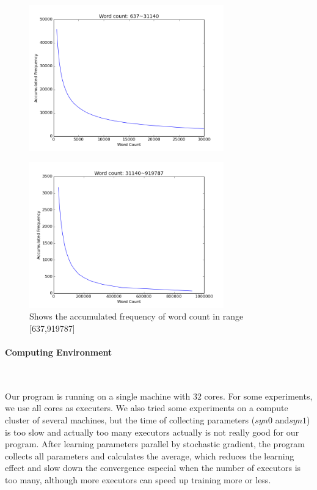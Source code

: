 \begin{figure}[H]
\centering
 	\includegraphics[width=0.75\textwidth]{637to31140} 
	\caption{Shows the accumulated frequency of word count in range [637,31140]}
	\label{fig:637to31140}
\begin{figure}[H]	
\end{figure}
\centering
	\includegraphics[width=0.75\textwidth]{31140torest} 
	\caption{Shows the accumulated frequency of word count in range [637,919787]}
	\label{fig:31140torest}
\end{figure}

\paragraph{Computing Environment} \ 

Our program is running on a single machine with 32 cores. For some experiments, we use all cores as executers. We also tried some experiments on a compute cluster of several machines, but the time of collecting parameters ($syn0$ and$syn1$) is too slow and actually too many executors actually is not really good for our program. After learning parameters parallel by stochastic gradient, the program collects all parameters and calculates the average, which reduces the learning effect and slow down the convergence especial when the number of executors is too many, although more executors can speed up training more or less. 


